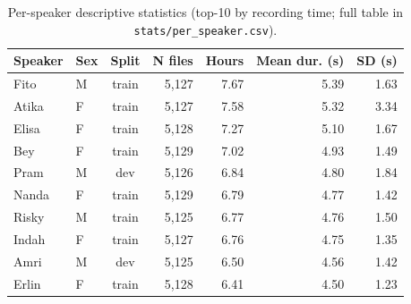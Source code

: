 \begin{table}[!t]
  \centering
  \caption{Per-speaker descriptive statistics (top-10 by recording time; full table in \texttt{stats/per\_speaker.csv}).}
  \label{tab:per_speaker}
  \small
  \begin{tabular}{llcrrrr}
  \toprule
  Speaker & Sex & Split & N files & Hours & Mean dur. (s) & SD (s) \\
  \midrule
  Fito & M & train & 5,127 & 7.67 & 5.39 & 1.63 \\
  Atika & F & train & 5,127 & 7.58 & 5.32 & 3.34 \\
  Elisa & F & train & 5,128 & 7.27 & 5.10 & 1.67 \\
  Bey & F & train & 5,129 & 7.02 & 4.93 & 1.49 \\
  Pram & M & dev & 5,126 & 6.84 & 4.80 & 1.84 \\
  Nanda & F & train & 5,129 & 6.79 & 4.77 & 1.42 \\
  Risky & M & train & 5,125 & 6.77 & 4.76 & 1.50 \\
  Indah & F & train & 5,127 & 6.76 & 4.75 & 1.35 \\
  Amri & M & dev & 5,125 & 6.50 & 4.56 & 1.42 \\
  Erlin & F & train & 5,128 & 6.41 & 4.50 & 1.23 \\
  \bottomrule
  \end{tabular}
\end{table}
